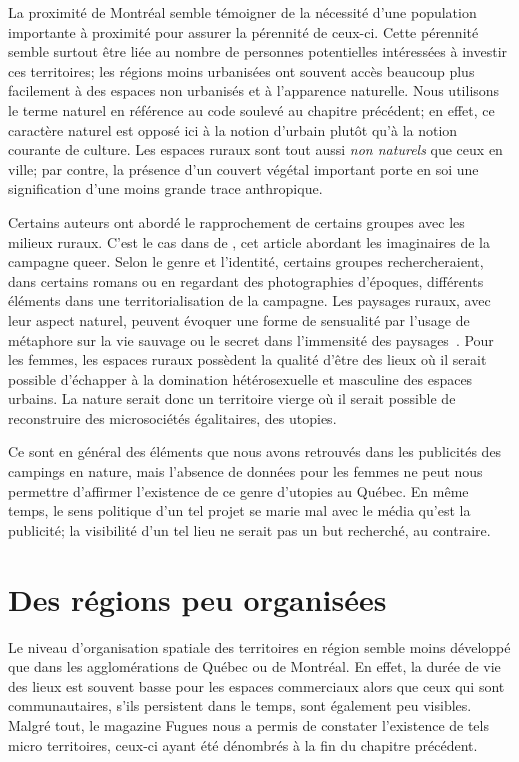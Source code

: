 La proximité de Montréal semble témoigner de la nécessité d'une population importante à proximité pour assurer la pérennité de ceux-ci.
Cette pérennité semble surtout être liée au nombre de personnes potentielles intéressées à investir ces territoires; les régions moins urbanisées ont souvent accès beaucoup plus facilement à des espaces non urbanisés et à l'apparence naturelle.
Nous utilisons le terme naturel en référence au code soulevé au chapitre précédent; en effet, ce caractère naturel est opposé ici à la notion d'urbain plutôt qu'à la notion courante de culture.
Les espaces ruraux sont tout aussi \emph{non naturels} que ceux en ville; par contre, la présence d'un couvert végétal important porte en soi une signification d'une moins grande trace anthropique.

Certains auteurs ont abordé le rapprochement de certains groupes \lgbt{} avec les milieux ruraux.
C'est le cas dans  de \citeauthor{Bell1995a}, cet article abordant les imaginaires de la campagne queer.
Selon le genre et l'identité, certains groupes rechercheraient, dans certains romans ou en regardant des photographies d'époques, différents éléments dans une territorialisation de la campagne.
Les paysages ruraux, avec leur aspect naturel, peuvent évoquer une forme de sensualité par l'usage de métaphore sur la vie sauvage ou le secret dans l'immensité des paysages~\citep[114]{Bell1995a}.
Pour les femmes, les espaces ruraux possèdent la qualité d'être des lieux où il serait possible d'échapper à la domination hétérosexuelle et masculine des espaces urbains.
La nature serait donc un territoire vierge où il serait possible de reconstruire des microsociétés égalitaires, des utopies.

Ce sont en général des éléments que nous avons retrouvés dans les publicités des campings en nature, mais l'absence de données pour les femmes ne peut nous permettre d'affirmer l'existence de ce genre d'utopies au Québec.
En même temps, le sens politique d'un tel projet se marie mal avec le média qu'est la publicité; la visibilité d'un tel lieu ne serait pas un but recherché, au contraire.

\section{Des régions peu organisées}
\label{sec:des_regions_peu_organisees}
Le niveau d'organisation spatiale des territoires en région semble moins développé que dans les agglomérations de Québec ou de Montréal.
En effet, la durée de vie des lieux est souvent basse pour les espaces commerciaux alors que ceux qui sont communautaires, s'ils persistent dans le temps, sont également peu visibles.
Malgré tout, le magazine Fugues nous a permis de constater l'existence de tels micro territoires, ceux-ci ayant été dénombrés à la fin du chapitre précédent.

